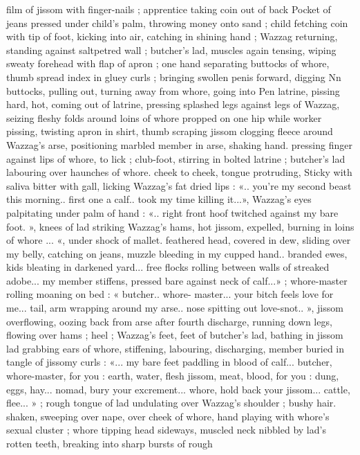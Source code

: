 film of jissom with finger-nails ; apprentice taking coin out of back
Pocket of jeans pressed under child's palm, throwing money onto
sand ; child fetching coin with tip of foot, kicking into air, catching in
shining hand ; Wazzag returning, standing against saltpetred wall ;
butcher's lad, muscles again tensing, wiping sweaty forehead with
flap of apron ; one hand separating buttocks of whore, thumb spread
index in gluey curls ; bringing swollen penis forward, digging
Nn buttocks, pulling out, turning away from whore, going into
Pen latrine, pissing hard, hot, coming out of latrine, pressing
splashed legs against legs of Wazzag, seizing fleshy folds around
loins of whore propped on one hip while worker pissing, twisting
apron in shirt, thumb scraping jissom clogging fleece around
Wazzag's arse, positioning marbled member in arse, shaking hand.
pressing finger against lips of whore, to lick ; club-foot, stirring in
bolted latrine ; butcher's lad labouring over haunches of whore.
cheek to cheek, tongue protruding, Sticky with saliva bitter with gall,
licking Wazzag's fat dried lips : «.. you're my second beast this
morning.. first one a calf.. took my time killing it...», Wazzag's eyes
palpitating under palm of hand : «.. right front hoof twitched against
my bare foot. », knees of lad striking Wazzag's hams, hot jissom,
expelled, burning in loins of whore ... «, under shock of mallet.
feathered head, covered in dew, sliding over my belly, catching on
jeans, muzzle bleeding in my cupped hand.. branded ewes, kids
bleating in darkened yard... free flocks rolling between walls of
streaked adobe... my member stiffens, pressed bare against neck of
calf...» ; whore-master rolling moaning on bed : « butcher.. whore-
master... your bitch feels love for me... tail, arm wrapping around my
arse.. nose spitting out love-snot.. », jissom overflowing, oozing back
from arse after fourth discharge, running down legs, flowing over
hams ; heel ; Wazzag's feet, feet of butcher's lad, bathing in jissom
lad grabbing ears of whore, stiffening, labouring, discharging,
member buried in tangle of jissomy curls : «... my bare feet paddling
in blood of calf... butcher, whore-master, for you : earth, water, flesh
jissom, meat, blood, for you : dung, eggs, hay... nomad, bury your
excrement... whore, hold back your jissom... cattle, flee... » ; rough
tongue of lad undulating over Wazzag's shoulder ; bushy hair.
shaken, sweeping over nape, over cheek of whore, hand playing with
whore’s sexual cluster ; whore tipping head sideways, muscled neck
nibbled by lad's rotten teeth, breaking into sharp bursts of rough
